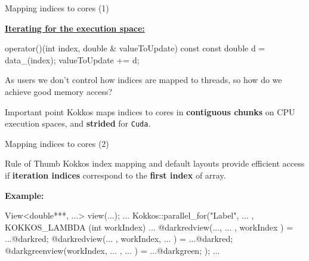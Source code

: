 
\ifmedium
\begin{frame}[fragile]{Mapping indices to cores (1)}

  \ul{\textbf{Iterating for the execution space:}}

  \begin{code}[keywords={}]
operator()(int index, double & valueToUpdate) const {
  const double d = data_(index);
  valueToUpdate += d;
}
  \end{code}

  \vspace{5pt}

  As users we don't control how indices are mapped to threads, so how do we achieve good memory access?

  \pause
  \vspace{3pt}

  \begin{block}{Important point}
    Kokkos maps indices to cores in \textbf{contiguous chunks} on CPU execution spaces, and \textbf{strided} for \texttt{Cuda}.
  \end{block}

\end{frame}
\fi


\begin{frame}[fragile]{Mapping indices to cores (2)}

  \begin{block}{Rule of Thumb}
    Kokkos index mapping and default layouts provide efficient access if \textbf{iteration indices} correspond to the \textbf{first index} of array.
  \end{block}

  \vspace{10pt}

  \textbf{Example:}

  \vspace{5pt}

  \begin{code}[keywords={}, frame=single]
  View<double***, ...> view(...);
  ...
  Kokkos::parallel_for("Label", ... ,
    KOKKOS_LAMBDA (int workIndex) {
      ...
      @darkredview(..., ... , workIndex ) = ...@darkred;
      @darkredview(... , workIndex, ... ) = ...@darkred;
      @darkgreenview(workIndex, ... , ... ) = ...@darkgreen;
    });
  ...
  \end{code}

\end{frame}


